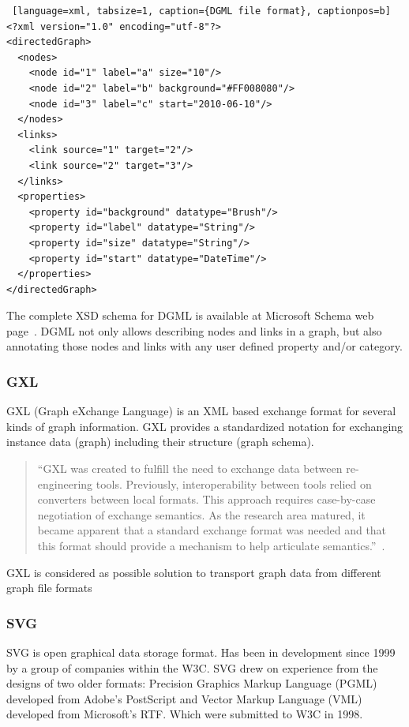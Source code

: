 \begin{center}
\renewcommand{\thelstlisting}{\thesection.\arabic{lstlisting}}
\begin{lstlisting} [language=xml, tabsize=1, caption={DGML file format}, captionpos=b]
<?xml version="1.0" encoding="utf-8"?>
<directedGraph>
  <nodes>
    <node id="1" label="a" size="10"/>
    <node id="2" label="b" background="#FF008080"/>
    <node id="3" label="c" start="2010-06-10"/>
  </nodes>
  <links>
    <link source="1" target="2"/>
    <link source="2" target="3"/>
  </links>
  <properties>
    <property id="background" datatype="Brush"/>
    <property id="label" datatype="String"/>
    <property id="size" datatype="String"/>
    <property id="start" datatype="DateTime"/>
  </properties>
</directedGraph>
\end{lstlisting}
\end{center}

The complete XSD schema for DGML is available at Microsoft Schema web page~\cite{DGML_XSD_URL}.
DGML not only allows describing nodes and links in a graph,
but also annotating those nodes and links with any user defined property and/or category.

\subsubsection{GXL}
GXL (Graph eXchange Language) is an XML based exchange format for several kinds of graph information.
GXL provides a standardized notation for exchanging instance data (graph) including their structure (graph schema).

\begin{quotation}
``GXL was created to fulfill the need to exchange data between re-engineering tools.
Previously, interoperability between tools relied on converters between local formats.
This approach requires case-by-case negotiation of exchange semantics.
As the research area matured, it became apparent that a standard exchange format
was needed and that this format should provide a mechanism to help articulate semantics.''~\cite{GXL}.
\end{quotation}

GXL is considered as possible solution to transport graph data from different graph file formats

\subsubsection{SVG}
SVG is open graphical data storage format. Has been in development since 1999 by a group of companies within the W3C. SVG drew on experience from the designs of two older formats: Precision Graphics Markup Language (PGML) developed from Adobe's PostScript and Vector Markup Language (VML) developed from Microsoft's RTF. Which were submitted to W3C in 1998.


